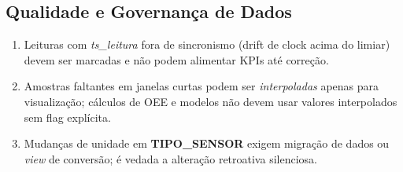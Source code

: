 \documentclass[a4paper,10pt]{article}
\let\oldtextbf\textbf
\renewcommand{\textbf}[1]{{\footnotesize\oldtextbf{#1}}}
\begin{document}
\subsection*{\small Qualidade e Governança de Dados}
\begin{enumerate}[label=RN-11.\arabic*, font=\footnotesize]
\item Leituras com \textit{ts\_leitura} fora de sincronismo (drift de clock acima do limiar) devem ser marcadas e não podem alimentar KPIs até correção.
\item Amostras faltantes em janelas curtas podem ser \emph{interpoladas} apenas para visualização; cálculos de OEE e modelos não devem usar valores interpolados sem flag explícita.
\item Mudanças de unidade em \textbf{TIPO\_SENSOR} exigem migração de dados ou \emph{view} de conversão; é vedada a alteração retroativa silenciosa.
\end{enumerate}
\end{document}
